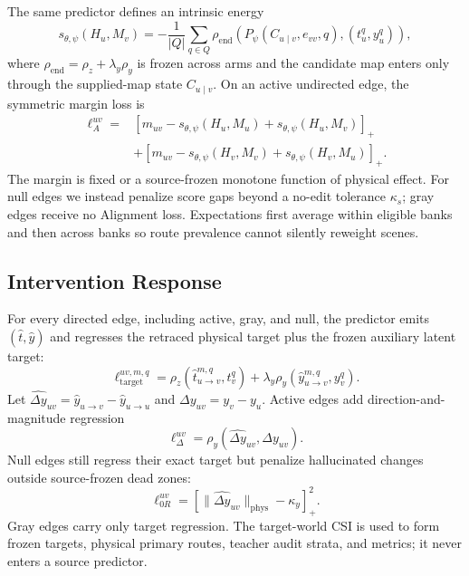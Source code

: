 \documentclass{article}
\newcommand{\csi}{H}
\newcommand{\map}{M}
\newcommand{\score}{s_{\theta,\psi}}
\begin{document}
The same predictor defines an intrinsic energy
\begin{equation}
 \score(\csi_u,\map_v)
 =-\frac{1}{|Q|}\sum_{q\in Q}
 \rho_{\mathrm{end}}\!\left(P_\psi(C_{u\mid v},e_{vv},q),(t_u^q,y_u^q)\right),
\end{equation}
where $\rho_{\mathrm{end}}=\rho_z+\lambda_y\rho_y$ is frozen across arms and
the candidate map enters only through the supplied-map state $C_{u\mid v}$.
On an active undirected edge, the symmetric margin loss is
\begin{align}
 \ell_A^{uv}={}&
 [m_{uv}-\score(\csi_u,\map_u)+\score(\csi_u,\map_v)]_+\\
 &+[m_{uv}-\score(\csi_v,\map_v)+\score(\csi_v,\map_u)]_+.
\end{align}
The margin is fixed or a source-frozen monotone function of physical effect.
For null edges we instead penalize score gaps beyond a no-edit tolerance
$\kappa_s$; gray edges receive no Alignment loss.  Expectations first average
within eligible banks and then across banks so route prevalence cannot silently
reweight scenes.

\subsection{Intervention Response}

For every directed edge, including active, gray, and null, the predictor emits
$(\widehat t,\widehat y)$ and regresses the retraced physical target plus the
frozen auxiliary latent target:
\begin{equation}
 \ell_{\mathrm{target}}^{uv,m,q}
 =\rho_z\!\left(\widehat t_{u\rightarrow v}^{m,q},t_v^q\right)
 +\lambda_y\rho_y\!\left(\widehat y_{u\rightarrow v}^{m,q},y_v^q\right).
\end{equation}
Let $\widehat{\Delta y}_{uv}=\widehat y_{u\rightarrow v}-
\widehat y_{u\rightarrow u}$ and $\Delta y_{uv}=y_v-y_u$. Active edges add
direction-and-magnitude regression
\begin{equation}
 \ell_\Delta^{uv}=\rho_y(\widehat{\Delta y}_{uv},\Delta y_{uv}).
\end{equation}
Null edges still regress their exact target but penalize hallucinated changes
outside source-frozen dead zones:
\begin{equation}
 \ell_{0R}^{uv}=
 [\|\widehat{\Delta y}_{uv}\|_{\mathrm{phys}}-\kappa_y]_+^2.
\end{equation}
Gray edges carry only target regression.  The target-world CSI is used to form
frozen targets, physical primary routes, teacher audit strata, and metrics; it
never enters a source predictor.
\end{document}
